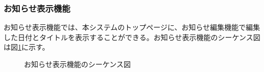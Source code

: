 \documentclass[a4j]{jarticle}
\begin{document}
  \subsubsection{お知らせ表示機能}
  お知らせ表示機能では、本システムのトップページに、お知らせ編集機能で編集した日付とタイトルを表示することができる。お知らせ表示機能のシーケンス図は図\ref{fig:admin_news_display.png}に示す。
  \begin{figure}[H]
    \centering
    \caption{お知らせ表示機能のシーケンス図}
    \label{fig:admin_news_display.png}
  \end{figure}
\end{document}
